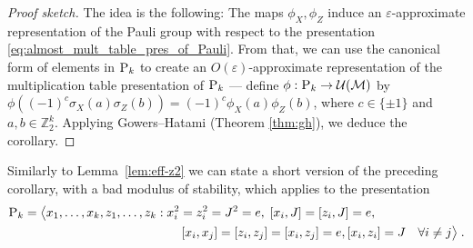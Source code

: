 \documentclass[11pt]{article}
\theoremstyle{definition}
\newcommand{\Id}{\ensuremath{I}}
\newcommand{\Z}{\ensuremath{\mathbb{Z}}}
\newcommand{\mM}{\ensuremath{\mathcal{M}}}
\newcommand{\mU}{\ensuremath{\mathcal{U}}}
\newcommand{\eps}{\varepsilon}
\newcommand{\gamestyle}[1]{\ensuremath{\textsc{#1}}\xspace}
\newcommand{\pauli}{\gamestyle{P}}
\begin{document}
\begin{proof}[Proof sketch]
The idea is the following: The maps $\phi_X,\phi_Z$ induce an $\eps$-approximate representation of the Pauli group with respect to the presentation \eqref{eq:almost_mult_table_pres_of_Pauli}. From that, we can use the canonical form of elements in $\pauli_k$ to create an $O(\eps)$-approximate representation of the multiplication table presentation of $\pauli_k$ --- define $\phi:\pauli_k \to \mU(\mM)$ by $\phi((-1)^c \sigma_X(a)\sigma_Z(b))= (-1)^c \phi_X(a)\phi_Z(b)$, where $c\in \{\pm 1\}$ and $a,b\in \Z_2^k$. Applying Gowers--Hatami (Theorem \ref{thm:gh}), we deduce the corollary.
\end{proof}

Similarly to Lemma~\ref{lem:eff-z2} we can state a short version of the preceding corollary, with a bad modulus of stability, which applies to the presentation
\begin{align}
 \pauli_k = \big\langle x_1,\ldots,x_k,z_1,\ldots,z_k &: x_i^2=z_i^2=J^2=e,\; [x_i,J]=[z_i,J]=e,\notag\\
&\qquad  [x_i,x_j]=[z_i,z_j]=[x_i,z_j]=e, [x_i,z_i]=J \quad \forall i\neq j \big\rangle\;.\label{eq:pauli-efficient}
\end{align}
\end{document}
